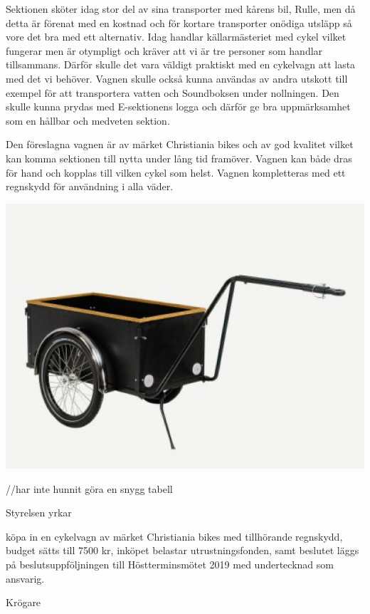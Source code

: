 \documentclass[../_main/handlingar.tex]{subfiles}
\begin{document}


Sektionen sköter idag stor del av sina transporter med kårens bil, Rulle, men då detta är förenat med en kostnad och för kortare transporter onödiga utsläpp så vore det bra med ett alternativ. Idag handlar källarmästeriet med cykel vilket fungerar men är otympligt och kräver att vi är tre personer som handlar tillsammans. Därför skulle det vara väldigt praktiskt med en cykelvagn att lasta med det vi behöver. Vagnen skulle också kunna användas av andra utskott till exempel för att transportera vatten och Soundboksen under nollningen. Den skulle kunna prydas med E-sektionens logga och därför ge bra uppmärksamhet som en hållbar och medveten sektion. 

Den föreslagna vagnen är av märket Christiania bikes och av god kvalitet vilket kan komma sektionen till nytta under lång tid framöver. Vagnen kan både dras för hand och kopplas till vilken cykel som helst. Vagnen kompletteras med ett regnskydd för användning i alla väder. 
 
    \begin{center}
     \includegraphics[scale=1]{../_res/vagn.png}
    \end{center}

    //har inte hunnit göra en snygg tabell

Styrelsen yrkar

\begin{attsatser}
    \att köpa in en cykelvagn av märket Christiania bikes med tillhörande regnskydd,
    \att budget sätts till 7500 kr, 
    \att inköpet belastar utrustningsfonden, samt
    \att beslutet läggs på beslutsuppföljningen till Höstterminsmötet 2019 med undertecknad som ansvarig.
  
\end{attsatser}

\begin{signatures}{1}
    \ist
    \signature{\krog}{Krögare}
    
\end{signatures}
\end{document}
